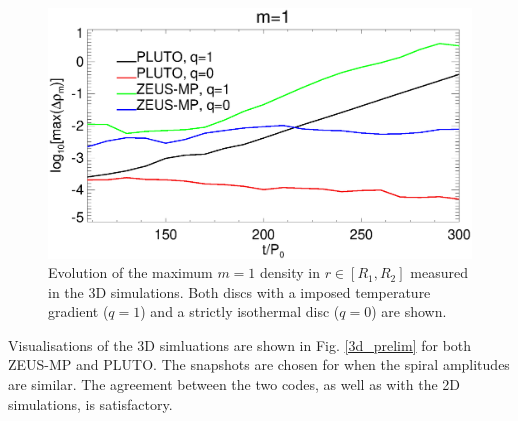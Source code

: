 \begin{figure}
  \includegraphics[width=\linewidth]{figures/m1_analysis_plot_ampmax3d.ps}
  \caption{Evolution of the maximum $m=1$ density in  $r\in[R_1,R_2]$
    measured in the 3D simulations. Both discs with a imposed
    temperature gradient ($q=1$) and a strictly isothermal disc
    ($q=0$) are shown. 
    \label{3d_ampmax}}   
\end{figure}

Visualisations of the 3D simluations are shown in Fig. \ref{3d_prelim} for
both ZEUS-MP and PLUTO. The snapshots are chosen for when the spiral
amplitudes are similar. The agreement between the two codes, as well
as with the 2D simulations, is satisfactory. 



